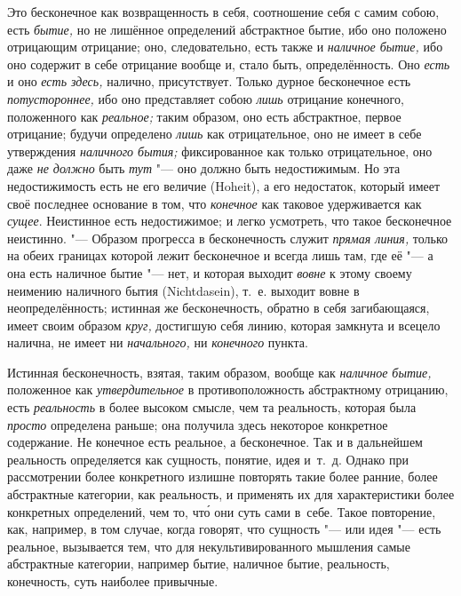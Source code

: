 Это бесконечное как возвращенность в себя, соотношение себя с самим собою,
есть {\em бытие,} но не лишённое определений
абстрактное бытие, ибо оно положено отрицающим отрицание; оно,
следовательно, есть также и {\em наличное бытие,} ибо
оно содержит в себе отрицание вообще и, стало быть, определённость. Оно
{\em есть} и оно {\em есть здесь,}
налично, присутствует. Только дурное бесконечное есть
{\em потустороннее,} ибо оно представляет собою
{\em лишь} отрицание конечного, положенного как
{\em реальное;} таким образом, оно есть абстрактное,
первое отрицание; будучи определено {\em лишь} как
отрицательное, оно не имеет в себе утверждения
{\em наличного бытия;} фиксированное как только
отрицательное, оно даже {\em не должно} быть
{\em тут} "--- оно должно быть недостижимым. Но эта
недостижимость есть не его величие (Hoheit), а его недостаток, который
имеет своё последнее основание в том, что
{\em конечное} как таковое удерживается как
{\em сущее}. Неистинное есть недостижимое; и легко
усмотреть, что такое бесконечное неистинно. "--- Образом прогресса в
бесконечность служит {\em прямая линия,} только на
обеих границах которой лежит бесконечное и всегда лишь там, где её "--- а она
есть наличное бытие "--- нет, и которая выходит
{\em вовне} к этому своему неимению наличного бытия
(Nicht\-dasein), т.~е. выходит вовне в неопределённость; истинная же
бесконечность, обратно в себя загибающаяся, имеет своим образом
{\em круг,} достигшую себя линию, которая замкнута и
всецело налична, не имеет ни {\em начального,} ни {\em конечного} пункта.

Истинная бесконечность, взятая, таким образом, вообще как
{\em наличное бытие,} положенное как
{\em утвердительное} в противоположность абстрактному
отрицанию, есть {\em реальность} в более высоком
смысле, чем та реальность, которая была {\em просто}
определена раньше; она получила здесь некоторое конкретное содержание. Не
конечное есть реальное, а бесконечное. Так и в дальнейшем реальность
определяется как сущность, понятие, идея и~т.~д. Однако при рассмотрении
более конкретного излишне повторять такие более ранние, более абстрактные
категории, как реальность, и применять их для характеристики более
конкретных определений, чем то, чт\'{о} они суть сами в~себе. Такое повторение,
как, например, в том случае, когда говорят,
что сущность "--- или идея "--- есть
реальное, вызывается тем, что для некультивированного мышления самые
абстрактные категории, например бытие, наличное бытие, реальность,
конечность, суть наиболее привычные.

